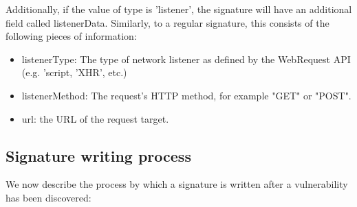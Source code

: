 Additionally, if the value of type is 'listener', the signature will have an additional field called listenerData. Similarly, to a regular signature, this consists of the following pieces of information:
\begin{itemize}
	\item 
	listenerType: The type of network listener as defined by the WebRequest API (e.g. 'script, 'XHR', etc.)
	\item
	listenerMethod: The request's HTTP method, for example "GET" or "POST".
	\item
	url: the URL of the request target.
\end{itemize}

\subsection{Signature writing process}
We now describe the process by which a signature is written after a vulnerability has been discovered:
